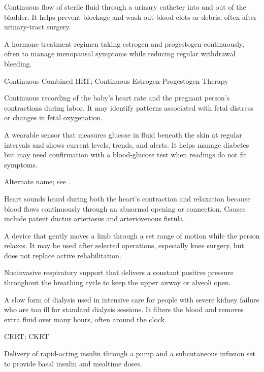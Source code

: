  Continuous flow of sterile fluid through a urinary catheter into and out of the bladder. It helps prevent blockage and wash out blood clots or debris, often after urinary-tract surgery.

 A hormone treatment regimen taking estrogen and progestogen continuously, often to manage menopausal symptoms while reducing regular withdrawal bleeding.

\synonyms
Continuous Combined HRT; Continuous Estrogen-Progestogen Therapy

 Continuous recording of the baby's heart rate and the pregnant person's contractions during labor. It may identify patterns associated with fetal distress or changes in fetal oxygenation.

 A wearable sensor that measures glucose in fluid beneath the skin at regular intervals and shows current levels, trends, and alerts. It helps manage diabetes but may need confirmation with a blood-glucose test when readings do not fit symptoms.

 Alternate name; see
.

 Heart sounds heard during both the heart's contraction and relaxation because blood flows continuously through an abnormal opening or connection. Causes include patent ductus arteriosus and arteriovenous fistula.

 A device that gently moves a limb through a set range of motion while the person relaxes. It may be used after selected operations, especially knee surgery, but does not replace active rehabilitation.

 Noninvasive respiratory support that delivers a constant positive pressure throughout
the breathing cycle to keep the upper airway or alveoli open.

 A slow form of dialysis
used in intensive care for people with severe kidney failure who are too ill
for standard dialysis sessions. It filters the blood and removes extra fluid
over many hours, often around the clock.

\synonyms
CRRT; CKRT

 Delivery of rapid-acting insulin through a pump and a subcutaneous infusion set to provide basal insulin and mealtime doses.

